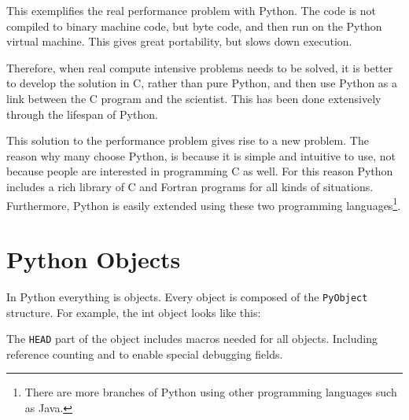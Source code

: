 This exemplifies the real performance problem with Python. The code is not
compiled to binary machine code, but byte code, and then run on the Python
virtual machine. This gives great portability, but slows down
execution.

Therefore, when real compute intensive problems needs to be solved, it is better to
develop the solution in C, rather than pure Python, and then use Python as
a link between the C program and the scientist. This has been done extensively through
the lifespan of Python.

This solution to the performance problem gives rise to a new problem. The
reason why many choose Python, is because it is simple and intuitive to use,
not because people are interested in programming C as well. For this reason
Python includes a rich library of C and Fortran programs for all
kinds of situations. Furthermore, Python is easily extended using these
two programming languages\footnote{There are more branches of Python
using other programming languages such as Java.}.\\




\section{Python Objects}

In Python everything is objects. Every object is composed of the
\texttt{PyObject} structure. For example, the int object looks like
this:



The \texttt{HEAD} part of the object includes macros needed for all
objects. Including reference counting and to enable special debugging
fields.

